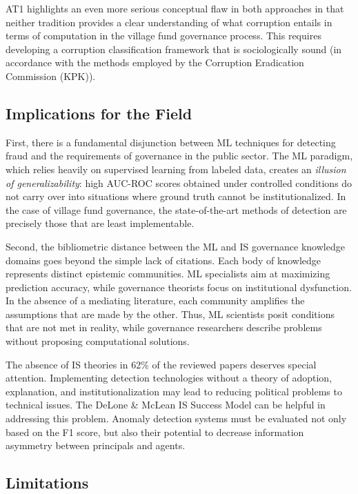 \documentclass[3p,times,procedia]{elsarticle}
\begin{document}
AT1 highlights an even more serious conceptual flaw in both approaches in that neither tradition provides a clear understanding of what corruption entails in terms of computation in the village fund governance process. This requires developing a corruption classification framework that is sociologically sound (in accordance with the methods employed by the Corruption Eradication Commission (KPK)).

\subsection{Implications for the Field}

First, there is a fundamental disjunction between ML techniques for detecting fraud and the requirements of governance in the public sector. The ML paradigm, which relies heavily on supervised learning from labeled data, creates an \textit{illusion of generalizability}: high AUC-ROC scores obtained under controlled conditions do not carry over into situations where ground truth cannot be institutionalized. In the case of village fund governance, the state-of-the-art methods of detection are precisely those that are least implementable.

Second, the bibliometric distance between the ML and IS governance knowledge domains goes beyond the simple lack of citations. Each body of knowledge represents distinct epistemic communities. ML specialists aim at maximizing prediction accuracy, while governance theorists focus on institutional dysfunction. In the absence of a mediating literature, each community amplifies the assumptions that are made by the other. Thus, ML scientists posit conditions that are not met in reality, while governance researchers describe problems without proposing computational solutions.

The absence of IS theories in 62\% of the reviewed papers deserves special attention. Implementing detection technologies without a theory of adoption, explanation, and institutionalization may lead to reducing political problems to technical issues. The DeLone \& McLean IS Success Model can be helpful in addressing this problem. Anomaly detection systems must be evaluated not only based on the F1 score, but also their potential to decrease information asymmetry between principals and agents.

\subsection{Limitations}
\end{document}
